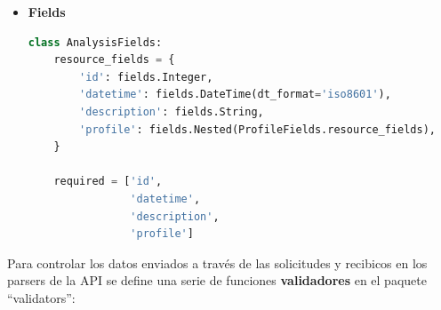 \documentclass[a4paper,12pt]{article}
\begin{document}
\begin{enumerate}
\begin{itemize}
	\item \textbf{Fields}
	
\begin{lstlisting}[language=Python]
class AnalysisFields:
    resource_fields = {
        'id': fields.Integer,
        'datetime': fields.DateTime(dt_format='iso8601'),
        'description': fields.String,
        'profile': fields.Nested(ProfileFields.resource_fields),
    }

    required = ['id',
                'datetime',
                'description',
                'profile']
\end{lstlisting}

\end{itemize}

\end{enumerate}

Para controlar los datos enviados a través de las solicitudes y recibicos en los parsers de la API se define una serie de funciones \textbf{validadores} en el paquete ``validators'':
\end{document}
